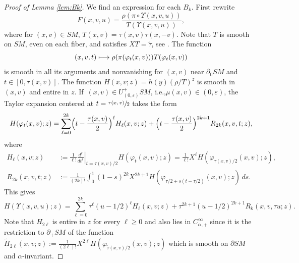 \documentclass[11pt]{article}
\newcommand{\ie}{i.e.,\xspace}
\def\mto{\mathchoice{\longmapsto}{\mapsto}{\mapsto}{\mapsto}}
\theoremstyle{plain}
\theoremstyle{definition}
\theoremstyle{remark}
\def\t{\tilde{\tau}}
\begin{document}
\begin{proof}[Proof of Lemma \ref{lem:Bk}]
We find an expression for each $B_k$. First rewrite
\[
F(x,v,u) = \frac{\rho(\pi\circ\Upsilon(x,v,u))}{T(\Upsilon(x,v,u))},
\]
where for $(x,v)\in SM$, $T(x,v) = \tau(x,v) \tau(x,-v)$. Note that $T$ is smooth on $SM$, even on each fiber, and satisfies
$XT = \t$, see \cite[Lem.\,3.2.11]{Paternain2021}. The function
\begin{equation*}
(x,v,t)\mto \rho(\pi (\varphi_t(x,v)))T(\varphi_t(x,v))
\end{equation*}
is smooth in all its arguments and nonvanishing for $(x,v)$ near $\partial_0 SM$ and $t\in [0,\tau(x,v)]$.
The function $H(x,v; z) = h(y) \left(\rho/T \right)^z$ is smooth in $(x,v)$ and entire in $z$.
If~$(x,v)\in U^+_{(0,\varepsilon)} SM$, \ie $\mu(x,v) \in (0,\varepsilon)$, the Taylor expansion centered at $t = \sfrac{\tau(x,v)}{2}$
takes the form
\begin{equation*}
H(\varphi_t(x,v); z) = \sum_{\ell=0}^{2k} \Bigl(t-\frac{\tau(x,v)}{2} \Bigr)^\ell H_\ell (x,v; z) + \Bigl(t-\frac{\tau(x,v)}{2} \Bigr)^{2k+1}
R_{2k}(x,v,t; z),
\end{equation*}
where
\begin{align*}
H_\ell(x,v; z) &:= \frac{1}{\ell !} \left. \frac{d^\ell}{dt^\ell}\right|_{t=\tau(x,v)/2} H(\varphi_{t}(x,v); z) = \frac{1}{\ell!} X^\ell H (\varphi_{\tau(x,v)/2}(x,v); z), \\
R_{2k} (x,v,t; z) &:= \frac{1}{(2k)!} \int_0^1 (1-s)^{2k} X^{2k+1} H (\varphi_{\tau/2+s(t-\tau/2)}(x,v); z)\,ds.
\end{align*}
This gives
\begin{equation*}
H(\Upsilon(x,v,u); z) = \sum_{\ell=0}^{2k} \tau^\ell (u-1/2)^\ell H_\ell(x,v; z) + \tau^{2k+1} (u-1/2)^{2k+1} R_{k} (x,v,\tau u; z).
\end{equation*}
Note that $H_{2\ell}$ is entire in $z$ for every $\ell \geq 0$ and also lies in $C_{\alpha,+}^\infty$ since it is the restriction to $\partial_+ SM$ of the function $\widetilde{H}_{2\ell} (x,v; z) :=
\frac{1}{(2\ell)!}X^{2\ell}H (\varphi_{\t(x,v)/2}(x,v); z)$ which is smooth on $\partial SM$ and $\alpha$-invariant.


\end{proof}
\end{document}
